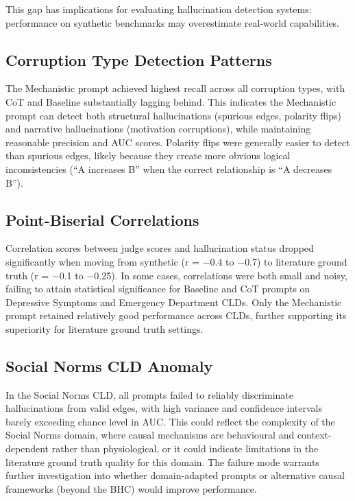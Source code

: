 This gap has implications for evaluating hallucination detection systems: performance on synthetic benchmarks may overestimate real-world capabilities.

\subsection{Corruption Type Detection Patterns}

The Mechanistic prompt achieved highest recall across all corruption types, with CoT and Baseline substantially lagging behind. This indicates the Mechanistic prompt can detect both structural hallucinations (spurious edges, polarity flips) and narrative hallucinations (motivation corruptions), while maintaining reasonable precision and AUC scores. Polarity flips were generally easier to detect than spurious edges, likely because they create more obvious logical inconsistencies (``A increases B'' when the correct relationship is ``A decreases B'').

\subsection{Point-Biserial Correlations}

Correlation scores between judge scores and hallucination status dropped significantly when moving from synthetic (r = $-$0.4 to $-$0.7) to literature ground truth (r = $-$0.1 to $-$0.25). In some cases, correlations were both small and noisy, failing to attain statistical significance for Baseline and CoT prompts on Depressive Symptoms and Emergency Department CLDs. Only the Mechanistic prompt retained relatively good performance across CLDs, further supporting its superiority for literature ground truth settings.

\subsection{Social Norms CLD Anomaly}

In the Social Norms CLD, all prompts failed to reliably discriminate hallucinations from valid edges, with high variance and confidence intervals barely exceeding chance level in AUC. This could reflect the complexity of the Social Norms domain, where causal mechanisms are behavioural and context-dependent rather than physiological, or it could indicate limitations in the literature ground truth quality for this domain. The failure mode warrants further investigation into whether domain-adapted prompts or alternative causal frameworks (beyond the BHC) would improve performance.

